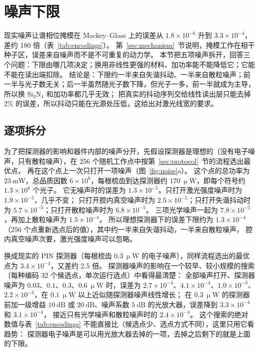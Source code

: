 \section{噪声下限}\label{sec:noise}

现实噪声让谱相位掩模在 Mackey--Glass 上的误差从 $1.8\times10^{-6}$ 升到 $3.3\times10^{-4}$，差约 180 倍（表~\ref{tab:encodings}）。
第~\ref{sec:mechanism}~节说明，掩模工作在相干种子区，误差来自噪声而不是不可重复的动力学。
本节把五项噪声拆开，回答三个问题：下限由哪几项决定；换用非线性更强的材料、加功率能不能降低它；它能不能在读出端扣除。
结论是：下限约一半来自失谐抖动、一半来自散粒噪声；前一半与光子数无关；后一半虽然随光子数下降，但光子一多，前一半就成为主导，所以换 Si$_3$N$_4$ 和加功率都几乎无效；
把真实的抖动序列交给线性读出层只能去掉 2\% 的误差，所以抖动只能在光源处压低，这给出对激光线宽的要求。

\subsection{逐项拆分}\label{sec:breakdown}

为了把探测器的影响和器件内部的噪声分开，先假设探测器是理想的（没有电子噪声，只有散粒噪声），在 256 个随机工作点中按第~\ref{sec:protocol}~节的流程选出最优点，
再在这个点上一次只打开一项噪声（图~\ref{fig:noise}a）。
这个点的总功率为 $23~\mathrm{mW}$，总品质因数 $6\times10^{6}$，每根梳齿到达探测器约 $170~\upmu\mathrm{W}$，即每个符号约 $1.3\times10^{6}$ 个光子。
它无噪声时的误差为 $1.3\times10^{-5}$。只打开激光强度噪声时为 $1.9\times10^{-5}$，几乎不变；
只打开腔内真空噪声时为 $2.5\times10^{-5}$；只打开失谐抖动时为 $5.7\times10^{-5}$；只打开散粒噪声时为 $6.8\times10^{-5}$。
三项光学噪声一起为 $7.8\times10^{-5}$，再加上散粒噪声为 $1.5\times10^{-4}$。
所以理想探测器下的误差下限约为 $1.3\times10^{-4}$（256 个点重新选点后的值），其中约一半来自失谐抖动，一半来自散粒噪声，
腔内真空噪声次要，激光强度噪声可以忽略。

换成现实的 PIN 探测器（每根梳齿 $0.3~\upmu\mathrm{W}$ 的电子噪声），同样流程选出的最优点为 $3.4\times10^{-4}$，又差约 2.5 倍。
探测器噪声的影响在一个较早、较小规模的搜索（每种编码 32 个候选点，单次运行选点）中看得最清楚：
全部噪声打开、探测器噪声为 $0.03$、$0.1$、$0.3$、$0.6~\upmu\mathrm{W}$ 时，误差为
$2.7\times10^{-4}$、$4.1\times10^{-4}$、$1.0\times10^{-3}$、$2.2\times10^{-3}$，在 $0.1~\upmu\mathrm{W}$ 以上近似随探测器噪声线性增长；
在 $0.3~\upmu\mathrm{W}$ 的探测器前加一级增益 $10~\mathrm{dB}$ 或 $20~\mathrm{dB}$、噪声系数 $5~\mathrm{dB}$ 的光放大器，误差降到 $3.3\times10^{-4}$ 和 $3.1\times10^{-4}$，
接近只有光学噪声和散粒噪声时的 $2.4\times10^{-4}$。
这个搜索的绝对数值与表~\ref{tab:encodings} 不能直接比（候选点少、选点方式不同），这里只用它看趋势：
探测器电子噪声是可以用光放大器去掉的一项，去掉之后剩下的就是上面的下限。

